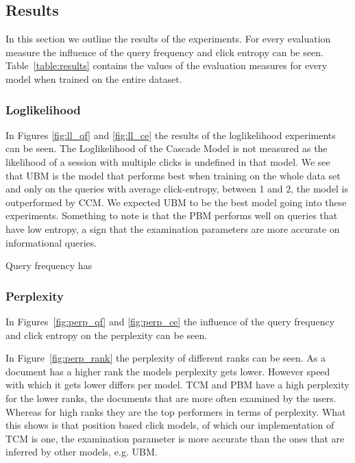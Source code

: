\subsection{Results}
In this section we outline the results of the experiments. For every evaluation measure the influence of the query frequency and click entropy can be seen. Table~\ref{table:results} contains the values of the evaluation measures for every model when trained on the entire dataset.

\subsubsection{Loglikelihood}
In Figures \ref{fig:ll_qf} and \ref{fig:ll_ce} the results of the loglikelihood experiments can be seen.  The Loglikelihood of the Cascade Model is not measured as the likelihood of a session with multiple clicks is undefined in that model. We see that UBM is the model that performs best when training on the whole data set and only on the queries with average click-entropy, between 1 and 2, the model is outperformed by CCM. We expected UBM to be the best model going into these experiments. Something to note is that the PBM performs well on queries that have low entropy, a sign that the examination parameters are more accurate on informational queries.

Query frequency has 

\subsubsection{Perplexity}
In Figures~\ref{fig:perp_qf} and \ref{fig:perp_ce} the influence of the query frequency and click entropy on the perplexity can be seen. 

In Figure~\ref{fig:perp_rank} the perplexity of different ranks can be seen. As a document has a higher rank the models perplexity gets lower. However speed with which it gets lower differs per model. TCM and PBM have a high perplexity for the lower ranks, the documents that are more often examined by the users. Whereas for high ranks they are the top performers in terms of perplexity. What this shows is that position based click models, of which our implementation of TCM is one, the examination parameter is more accurate than the ones that are inferred by other models, e.g. UBM. 

